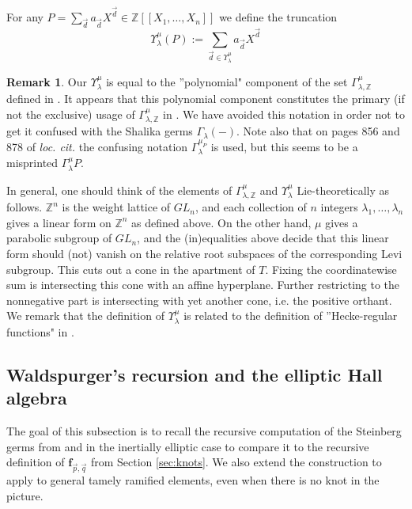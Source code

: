 \documentclass{amsart}
\numberwithin{equation}{section}
\theoremstyle{definition}
\newtheorem{remark}[lemma]{Remark}%
\newcommand{\frs}{\mathbf{f}_{\vec{p},\vec{q}}}
\newcommand{\fpq}{\frs}
\newcommand{\Z}{{\mathbb Z}}
\begin{document}
\vspace{1cm}
For any $P=\sum_{\vec{d}}a_{\vec{d}}X^{\vec{d}} \in \Z[[X_1,\ldots,X_n]]$ we define the truncation
\begin{equation} 
\label{eq:restrictedseries}
\Upsilon_\lambda^\mu(P):=\sum_{\vec{d}\in \Upsilon^\mu_\lambda}a_{\vec{d}}X^{\vec{d}}
\end{equation}
\begin{remark}
Our $\Upsilon^\mu_\lambda$ is equal to the ''polynomial" component of the set $\Gamma^\mu_{\lambda,\Z}$ defined in \cite[I 10]{W2}. It appears that this polynomial component constitutes the primary (if not the exclusive) usage of $\Gamma^\mu_{\lambda,\Z}$ in \cite{W2}. We have avoided this notation in order not to get it confused with the Shalika germs $\Gamma_\lambda(-)$. Note also that on pages 856 and 878 of {\em loc. cit.} the confusing notation $\Gamma^{\mu_P}_\lambda$ is used, but this seems to be a misprinted $\Gamma^{\mu}_\lambda P$. 

In general, one should think of the elements of $\Gamma^\mu_{\lambda,\Z}$ and $\Upsilon^\mu_\lambda$ Lie-theoretically as follows. $\Z^n$ is the weight lattice of $GL_n$, and each collection of $n$ integers $\lambda_1,\ldots,\lambda_n$ gives a linear form on $\Z^n$ as defined above. On the other hand, $\mu$ gives a parabolic subgroup of $GL_n$, and the (in)equalities above decide that this linear form should (not) vanish on the relative root subspaces of the corresponding Levi subgroup. This cuts out a cone in the apartment of $T$. Fixing the coordinatewise sum is intersecting this cone with an affine hyperplane. Further restricting to the nonnegative part is intersecting with yet another cone, i.e. the positive orthant. We remark that the definition of $\Upsilon^\mu_\lambda$ is related to the definition of ''Hecke-regular functions" in \cite[Section 4]{AC}. 
\end{remark}

\subsection{Waldspurger's recursion and the elliptic Hall algebra}
\label{sec:w2}
The goal of this subsection is to recall the recursive computation of the Steinberg germs from \cite{W2} and in the inertially elliptic case to compare it to the recursive definition of $\fpq$ from Section \ref{sec:knots}. We also extend the construction to apply to general tamely ramified elements, even when there is no knot in the picture.
\end{document}
